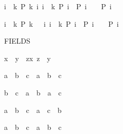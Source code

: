 \begin{isabellebody}
\begin{isamarkuptext}
\begin{isabelle}%
{\isasymlbrakk}i\ {\isasymle}\ k{\isacharsemicolon}\ P\ k{\isacharsemicolon}\ {\isasymAnd}i{\isachardot}\ {\isasymlbrakk}i\ {\isasymle}\ k{\isacharsemicolon}\ P\ i{\isasymrbrakk}\ {\isasymLongrightarrow}\ P\ {\isacharparenleft}i\ {\isacharminus}\ {}{\isacharparenright}{\isasymrbrakk}\ {\isasymLongrightarrow}\ P\ i%
\end{isabelle}

\begin{isabelle}%
{\isasymlbrakk}i\ {\isacharless}\ k{\isacharsemicolon}\ P\ {\isacharparenleft}k\ {\isacharminus}\ {}{\isacharparenright}{\isacharsemicolon}\ {\isasymAnd}i{\isachardot}\ {\isasymlbrakk}i\ {\isacharless}\ k{\isacharsemicolon}\ P\ i{\isasymrbrakk}\ {\isasymLongrightarrow}\ P\ {\isacharparenleft}i\ {\isacharminus}\ {}{\isacharparenright}{\isasymrbrakk}\ {\isasymLongrightarrow}\ P\ i%
\end{isabelle}
%
\end{isamarkuptext}%
\isamarkuptrue%
%
\begin{isamarkuptext}%
FIELDS

\begin{isabelle}%
x\ {\isacharless}\ y\ {\isasymLongrightarrow}\ {\isasymexists}z{\isachargreater}x{\isachardot}\ z\ {\isacharless}\ y%
\end{isabelle}

\begin{isabelle}%
a\ {\isacharasterisk}\ {\isacharparenleft}b\ {\isacharslash}\ c{\isacharparenright}\ {\isacharequal}\ a\ {\isacharasterisk}\ b\ {\isacharslash}\ c%
\end{isabelle}

\begin{isabelle}%
b\ {\isacharslash}\ c\ {\isacharasterisk}\ a\ {\isacharequal}\ b\ {\isacharasterisk}\ a\ {\isacharslash}\ c%
\end{isabelle}

\begin{isabelle}%
a\ {\isacharslash}\ {\isacharparenleft}b\ {\isacharslash}\ c{\isacharparenright}\ {\isacharequal}\ a\ {\isacharasterisk}\ c\ {\isacharslash}\ b%
\end{isabelle}

\begin{isabelle}%
a\ {\isacharslash}\ b\ {\isacharslash}\ c\ {\isacharequal}\ a\ {\isacharslash}\ {\isacharparenleft}b\ {\isacharasterisk}\ c{\isacharparenright}%
\end{isabelle}


\end{isamarkuptext}
\end{isabellebody}
